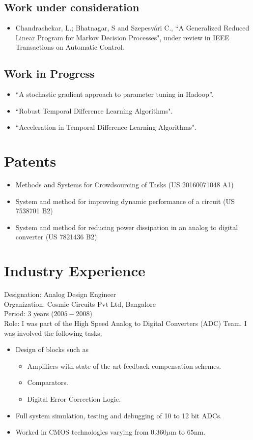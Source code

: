 \documentclass[line,margin]{res}
\begin{document}
\begin{resume}
\subsection{Work under consideration}
\begin{itemize}
\item Chandrashekar, L.;  Bhatnagar, S and Szepesv\'{a}ri C., ``A Generalized Reduced Linear Program for Markov Decision Processes", under review in IEEE Transactions on Automatic Control.
\end{itemize}
\subsection{Work in Progress}
\begin{itemize}
\item ``A stochastic gradient approach to parameter tuning in Hadoop''.
\item ``Robust Temporal Difference Learning Algorithms".
\item ``Acceleration in Temporal Difference Learning Algorithms".
\end{itemize}
\section{Patents}
\begin{itemize}
\item {Methods and Systems for Crowdsourcing of Tasks (US 20160071048 A1)}\\
\item System and method for improving dynamic performance of a circuit (US 7538701 B2)\\
\item System and method for reducing power dissipation in an analog to digital converter (US 7821436 B2)\\
\end{itemize}

\section{Industry Experience}
Designation: Analog Design Engineer\\
Organization: Cosmic Circuits Pvt Ltd, Bangalore\\
Period: 3 years ($2005-2008$) \\
Role: I was part of the High Speed Analog to Digital Converters (ADC) Team. I was involved the following tasks:
\begin{itemize}
\item Design of blocks such as
\begin{itemize}
\item Amplifiers with state-of-the-art feedback compensation schemes.
\item Comparators.
\item Digital Error Correction Logic.
\end{itemize}
\item Full system simulation, testing and debugging of 10 to 12 bit ADCs.
\item Worked in CMOS technologies varying from $0.360\mu$m to $65$nm.
\end{itemize}

\end{resume}
\end{document}
